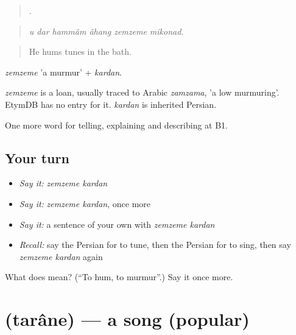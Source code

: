 \begin{quote}
     .
\end{quote}

\begin{quote}
\emph{u dar hammâm âhang zemzeme mikonad.}
\end{quote}

\begin{quote}
He hums tunes in the bath.
\end{quote}

\emph{zemzeme} 'a murmur' + \emph{kardan}.

\begin{cousinweb}
\emph{zemzeme} is a loan, usually traced to Arabic \emph{zamzama}, 'a low murmuring'. EtymDB has no entry for it. \emph{kardan} is inherited Persian.
\end{cousinweb}

\begin{grammarlens}[title={What you've built}]
One more word for telling, explaining and describing at B1.
\end{grammarlens}

\subsection*{Your turn}
\begin{itemize}
\raggedright
  \item \emph{Say it:} \emph{zemzeme kardan}
  \item \emph{Say it:} \emph{zemzeme kardan}, once more
  \item \emph{Say it:} a sentence of your own with \emph{zemzeme kardan}
  \item \emph{Recall:} say the Persian for to tune, then the Persian for to sing, then say \emph{zemzeme kardan} again
\end{itemize}

\begin{tcolorbox}[breakable,colback=teal!4,colframe=teal!35!black,title={Before you move on}]
What does   mean? (\textquotedblleft{}To hum, to murmur\textquotedblright{}.) Say it once more.
\end{tcolorbox}
\section[\texorpdfstring{\fa{ترانه} (tarâne)}{ترانه (tarâne)}]{ (tarâne) — a song (popular)}

